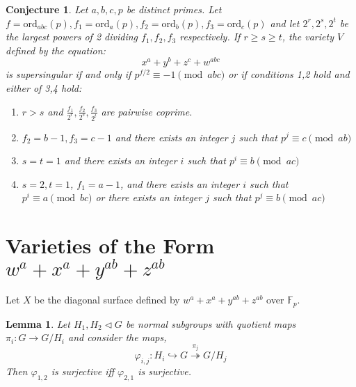 \documentclass{article}
\newcommand{\finfield}[1]{\mathbb{F}_{#1}}
\newcommand{\ord}[0]{\mathrm{ord}}
\newtheorem{lemma}[theorem]{Lemma}
\newtheorem{conjecture}[theorem]{Conjecture}
\theoremstyle{definition}
\theoremstyle{definition}
\theoremstyle{remark}
\begin{document}
\begin{conjecture} Let $a,b,c,p$ be distinct primes. Let $f = \ord_{abc}(p), f_1 = \ord_{a}(p), f_2 = \ord_{b}(p), f_3 = \ord_{c}(p)$ and let $2^r, 2^s, 2^t$ be the largest powers of 2 dividing $f_1, f_2, f_3$ respectively. If $r \ge s \ge t$, the variety $V$ defined by the equation:
\[x^a + y^b + z^c + w^{abc}\]
is supersingular if and only if $p^{f/2} \equiv -1 \pmod{abc}$ or if conditions 1,2 hold and either of 3,4 hold:
\begin{enumerate}
\item $r > s$ and $\frac{f_1}{2^r}, \frac{f_2}{2^s}, \frac{f_3}{2^t}$ are pairwise coprime. 
\item $f_2 = b - 1, f_3 = c - 1$ and there exists an integer $j$ such that $p^j \equiv c \pmod{ab}$
\item $s=t=1$ and there exists an integer $i$ such that $p^i \equiv b \pmod{ac}$ 
\item $s=2, t= 1$, $f_1 = a - 1$, and there exists an integer $i$ such that $p^i \equiv a \pmod{bc}$ or there exists an integer $j$ such that $p^j \equiv b \pmod{ac}$ 
\end{enumerate}
\end{conjecture}

\section{Varieties of the Form $w^{a} + x^{a} + y^{ab} + z^{ab}$}

Let $X$ be the diagonal surface defined by $w^{a} + x^{a} + y^{ab} + z^{ab}$ over $\finfield{p}$.

\begin{lemma} \label{lem:surjective_quotient_maps}
Let $H_1, H_2 \triangleleft G$ be normal subgroups with quotient maps $\pi_i : G \to G / H_i$ and consider the maps,
\[ \varphi_{i,j} : H_i \hookrightarrow G \overset{\pi_j}{\twoheadrightarrow} G/H_j \]
Then $\varphi_{1,2}$ is surjective iff $\varphi_{2,1}$ is surjective. 
\end{lemma}
\end{document}
